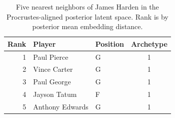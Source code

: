 \begin{table}[htbp]
  \centering\small
  \begin{tabular}{rllc}
    \toprule
    Rank & Player & Position & Archetype \\
    \midrule
    1 & Paul Pierce & G & 1 \\
    2 & Vince Carter & G & 1 \\
    3 & Paul George & G & 1 \\
    4 & Jayson Tatum & F & 1 \\
    5 & Anthony Edwards & G & 1 \\
    \bottomrule
  \end{tabular}
  \caption{Five nearest neighbors of James Harden in the Procrustes-aligned posterior latent space. Rank is by posterior mean embedding distance.}
  \label{tab:James_Harden_neighbors}
\end{table}

